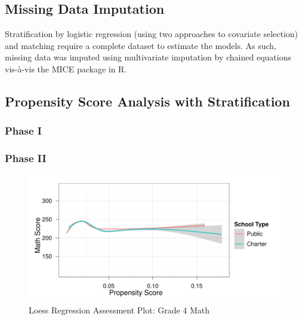 \documentclass[letterpaper,12p,twoside]{article} %
\begin{document}
\subsection{Missing Data Imputation}
Stratification by logistic regression (using two approaches to covariate selection) and matching require a complete dataset to estimate the models. As such, missing data was imputed using multivariate imputation by chained equations  vis-\`a-vis the MICE package  in R.




\subsection{Propensity Score Analysis with Stratification}

\subsubsection{Phase I}

\subsubsection{Phase II}

\begin{figure}[tp]
\begin{center}
\includegraphics[width=\textwidth]{../Figures/g4mathloess.pdf}
\caption{Loess Regression Assessment Plot: Grade 4 Math}
\label{fig:g4math:loess}
\end{center}
\end{figure}
\end{document}
